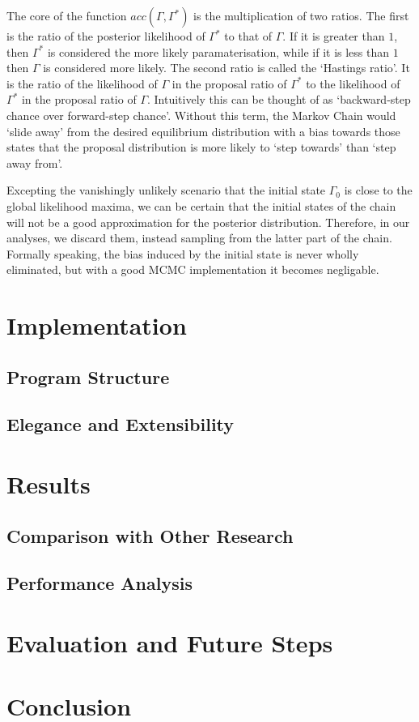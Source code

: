 \documentclass[10pt,journal,compsoc]{IEEEtran}
\begin{document}
The core of the function $acc(\Gamma, \Gamma^*)$ is the multiplication of two ratios. The first is the ratio of the posterior likelihood of $\Gamma^*$ to that of $\Gamma$. If it is greater than $1$, then $\Gamma^*$ is considered the more likely paramaterisation, while if it is less than $1$ then $\Gamma$ is considered more likely. The second ratio is called the `Hastings ratio'. It is the ratio of the likelihood of $\Gamma$ in the proposal ratio of $\Gamma^*$ to the likelihood of $\Gamma^*$ in the proposal ratio of $\Gamma$. Intuitively this can be thought of as `backward-step chance over forward-step chance'. Without this term, the Markov Chain would `slide away' from the desired equilibrium distribution with a bias towards those states that the proposal distribution is more likely to `step towards' than `step away from'.

Excepting the vanishingly unlikely scenario that the initial state $\Gamma_0$ is close to the global likelihood maxima, we can be certain that the initial states of the chain will not be a good approximation for the posterior distribution. Therefore, in our analyses, we discard them, instead sampling from the latter part of the chain. Formally speaking, the bias induced by the initial state is never wholly eliminated, but with a good MCMC implementation it becomes negligable.

\section{Implementation}

\subsection{Program Structure}

\subsection{Elegance and Extensibility}

\section{Results}

\subsection{Comparison with Other Research}

\subsection{Performance Analysis}

\section{Evaluation and Future Steps}

\section{Conclusion}

\newpage



\end{document}
